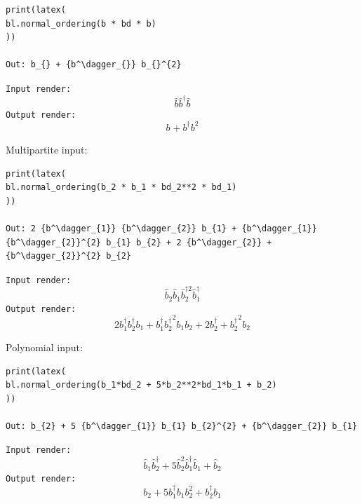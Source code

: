 \documentclass[onecolumn, 12pt, sort&compress]{elsarticle}
\newcommand{\inlinecode}[1]{\texttt{#1}}
\newcommand{\bop}{\hat{b}}
\newcommand{\bdag}{\bop^\dagger}
\newcommand{\bdagn}[1]{\bop^{\dagger {#1}}}
\newenvironment{revision2}{%
\color{red}
}
{}
\begin{document}
\begin{verbatim}
print(latex(
bl.normal_ordering(b * bd * b)
))

Out: b_{} + {b^\dagger_{}} b_{}^{2}
\end{verbatim}
\begin{revision2}
\inlinecode{Input render:}
\begin{equation*}
    \bop\bdag\bop
\end{equation*}
\inlinecode{Output render:}
\begin{equation*}
    b_{} + {b^\dagger_{}} b_{}^{2}
\end{equation*}
\end{revision2}

\noindent Multipartite input:
\begin{verbatim}
print(latex(
bl.normal_ordering(b_2 * b_1 * bd_2**2 * bd_1)
))

Out: 2 {b^\dagger_{1}} {b^\dagger_{2}} b_{1} + {b^\dagger_{1}} {b^\dagger_{2}}^{2} b_{1} b_{2} + 2 {b^\dagger_{2}} + {b^\dagger_{2}}^{2} b_{2}
\end{verbatim}
\begin{revision2}
\inlinecode{Input render:}
\begin{equation*}
    \bop_2\bop_1\bdagn{2}_2\bdag_1
\end{equation*}
\inlinecode{Output render:}
\begin{equation*}
    2 {b^\dagger_{1}} {b^\dagger_{2}} b_{1} + {b^\dagger_{1}} {b^\dagger_{2}}^{2} b_{1} b_{2} + 2 {b^\dagger_{2}} + {b^\dagger_{2}}^{2} b_{2}
\end{equation*}
\end{revision2}

\noindent Polynomial input:
\begin{verbatim}
print(latex(
bl.normal_ordering(b_1*bd_2 + 5*b_2**2*bd_1*b_1 + b_2)
))

Out: b_{2} + 5 {b^\dagger_{1}} b_{1} b_{2}^{2} + {b^\dagger_{2}} b_{1}
\end{verbatim}
\begin{revision2}
\inlinecode{Input render:}
\begin{equation*}
    \bop_1 \bdag_2 + 5\bop_2^2 \bdag_1\bop_1 + \bop_2
\end{equation*}
\inlinecode{Output render:}
\begin{equation*}
    b_{2} + 5 {b^\dagger_{1}} b_{1} b_{2}^{2} + {b^\dagger_{2}} b_{1}
\end{equation*}
\end{revision2}
\end{document}
